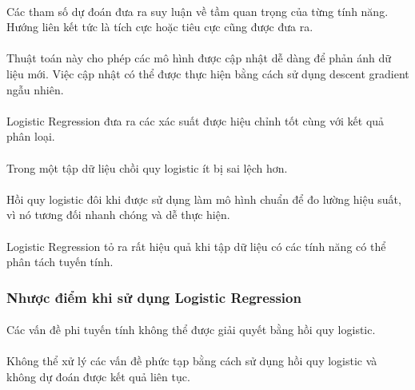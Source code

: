 \documentclass{article}
\begin{document}
\paragraph{}Các tham số dự đoán đưa ra suy luận về tầm quan trọng của từng tính năng. Hướng liên kết tức là tích cực hoặc tiêu cực cũng được đưa ra.

\paragraph{}Thuật toán này cho phép các mô hình được cập nhật dễ dàng để phản ánh dữ liệu mới. Việc cập nhật có thể được thực hiện bằng cách sử dụng descent gradient ngẫu nhiên.

\paragraph{}Logistic Regression đưa ra các xác suất được hiệu chỉnh tốt cùng với kết quả phân loại.

\paragraph{}Trong một tập dữ liệu chồi quy logistic ít bị sai lệch hơn.

\paragraph{}Hồi quy logistic đôi khi được sử dụng làm mô hình chuẩn để đo lường hiệu suất, vì nó tương đối nhanh chóng và dễ thực hiện.

\paragraph{}Logistic Regression tỏ ra rất hiệu quả khi tập dữ liệu có các tính năng có thể phân tách tuyến tính.
\subsubsection{Nhược điểm khi sử dụng Logistic Regression}
\paragraph{}Các vấn đề phi tuyến tính không thể được giải quyết bằng hồi quy logistic.
\paragraph{}Không thể xử lý các vấn đề phức tạp bằng cách sử dụng hồi quy logistic và không dự đoán được kết quả liên tục.
\end{document}
